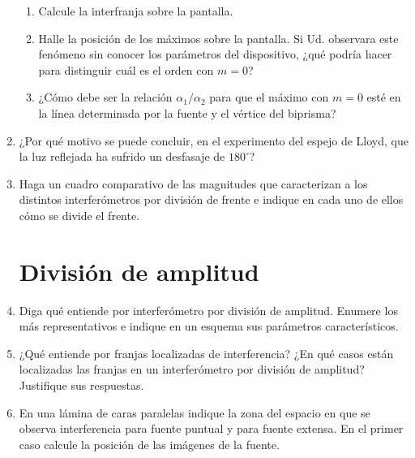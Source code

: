 \documentclass[11pt,spanish]{article}
\begin{document}
\begin{enumerate}
\begin{enumerate}
        \item Calcule la interfranja sobre la pantalla. 

        \item Halle la posición de los máximos sobre la pantalla. Si Ud. observara
        este fenómeno sin conocer los parámetros del dispositivo, ¿qué podría
        hacer para distinguir cuál es el orden con $m=0$? 

        \item ¿Cómo debe ser la relación $\alpha_{1}/\alpha_{2}$ para que el máximo
        con $m=0$ esté en la línea determinada por la fuente y el vértice
        del biprisma?
    \end{enumerate}

    
    \item ¿Por qué motivo se puede concluir, en el experimento del espejo de
    Lloyd, que la luz reflejada ha sufrido un desfasaje de $180^{\circ}$?


    \item Haga un cuadro comparativo de las magnitudes que caracterizan a los
    distintos interferómetros por división de frente e indique en cada
    uno de ellos cómo se divide el frente. 

    
\section*{División de amplitud}


    \item Diga qué entiende por interferómetro por división de amplitud. Enumere
    los más representativos e indique en un esquema sus parámetros característicos.
    

    \item ¿Qué entiende por franjas localizadas de interferencia? ¿En qué casos
    están localizadas las franjas en un interferómetro por división de
    amplitud? Justifique sus respuestas.


    \item En una lámina de caras paralelas indique la zona del espacio en que
    se observa interferencia para fuente puntual y para fuente extensa.
    En el primer caso calcule la posición de las imágenes de la fuente. 


\end{enumerate}
\end{document}

